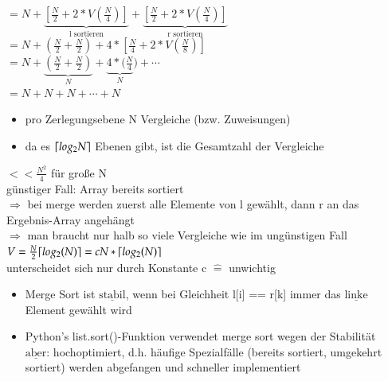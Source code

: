 \documentclass[11pt, fleqn]{scrreprt}
\DeclarePairedDelimiter\ceil{\lceil}{\rceil}
\begin{document}
		\hspace*{19.5mm} $= N + \underbrace{[\frac{N}{2} + 2 * V(\frac{N}{4})]}_{\text{l sortieren}} + \underbrace{[\frac{N}{2} + 2 * V(\frac{N}{4})]}_{\text{r sortieren}}$ \\
		
		\hspace*{19.5mm} $= N + (\frac{N}{2} + \frac{N}{2}) + 4 * [\frac{N}{4} + 2 * V(\frac{N}{8})] $\\
		
		\hspace*{19.5mm} $= N + \underbrace{(\frac{N}{2} + \frac{N}{2})}_{N} + \underbrace{4 * (\frac{N}{4}}_{N}) + \cdots $\\
		
		\hspace*{19.5mm} $= N + N + N + \cdots + N$
		
		\begin{itemize}[label={$\Rightarrow$}]
			\item pro Zerlegungsebene N Vergleiche (bzw. Zuweisungen)
			\item da es $\ceil{log_2 N}$ Ebenen gibt, ist die Gesamtzahl der Vergleiche
		\end{itemize}
		
		\hspace*{5mm}  $<< \frac{N^2}{4}$ für große N \\
		
		
		günstiger Fall: Array bereits sortiert \\
		
		$\Rightarrow$ bei merge werden zuerst alle Elemente von l gewählt, dann r an das Ergebnis-Array angehängt \\
		
		$\Rightarrow$ man braucht nur halb so viele Vergleiche wie im ungünstigen Fall \\
		
		\hspace*{5mm} $V= \frac{N}{2} \ceil{log_2(N)} = c N * \ceil{log_2(N)}$ \\
		
		unterscheidet sich nur durch Konstante c $\widehat{=}$ unwichtig \\
		
		\begin{itemize}
			\item Merge Sort ist $\underline{\text{stabil}}$, wenn bei Gleichheit l[i] == r[k] immer das $\underline{\text{linke}}$ Element gewählt wird
			\item Python's list.sort()-Funktion verwendet merge sort wegen der Stabilität\\
			$\underline{\text{aber}}$: hochoptimiert, d.h. häufige Spezialfälle (bereits sortiert, umgekehrt sortiert) werden abgefangen und schneller implementiert
		\end{itemize}
	
\end{document}
